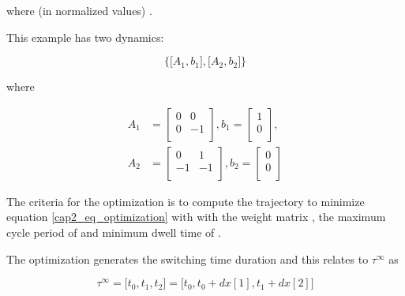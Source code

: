 \noindent
where (in normalized values) . 

This example has two dynamics:

\noindent
\begin{equation}
    \Big\{\big[A_1,b_1\big], \big[A_2,b_2\big]\Big\}
\end{equation}

\noindent
where

\noindent
\begin{align}
    A_1 &= \left[
        \begin{matrix}
            0 & 0 \\ 
            0 & -1 \\ 
        \end{matrix}
    \right],
    b_1 = \left[
        \begin{matrix}
            1 \\ 
            0 \\ 
        \end{matrix}
    \right], \\
    A_2 &= \left[
        \begin{matrix}
            0 & 1 \\ 
            -1 & -1 \\ 
        \end{matrix}
    \right],
    b_2 = \left[
        \begin{matrix}
            0 \\ 
            0 \\ 
        \end{matrix}
    \right]
\end{align}



The criteria for the optimization is to compute the trajectory to minimize equation \eqref{cap2_eq_optimization} 
with  with the weight matrix 
, the maximum cycle period of 
 and minimum dwell time of .


The optimization generates the switching time duration and this relates to $\tau^\infty$ as

\noindent
\begin{equation}
    \tau^\infty = \Big[t_0, t_1, t_2\Big] = \Big[t_0, t_0 + dx[1], t_1 + dx[2]\Big]
\end{equation}

